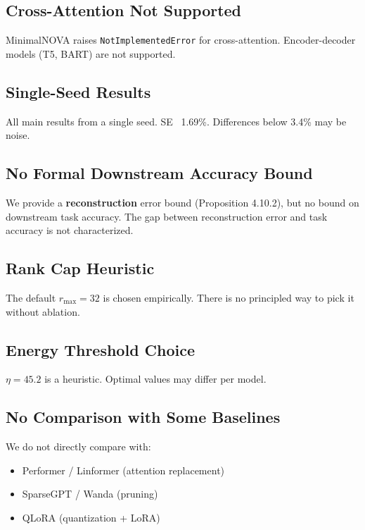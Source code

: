 \subsection{Cross-Attention Not Supported}

MinimalNOVA raises \texttt{NotImplementedError} for cross-attention. Encoder-decoder 
models (T5, BART) are not supported.

\subsection{Single-Seed Results}

All main results from a single seed. SE ~1.69\%. Differences below 3.4\% may 
be noise.

\subsection{No Formal Downstream Accuracy Bound}

We provide a \textbf{reconstruction} error bound (Proposition 4.10.2), but no 
bound on downstream task accuracy. The gap between reconstruction error and 
task accuracy is not characterized.

\subsection{Rank Cap Heuristic}

The default $r_\text{max} = 32$ is chosen empirically. There is no 
principled way to pick it without ablation.

\subsection{Energy Threshold Choice}

$\eta = 45.2$ is a heuristic. Optimal values may differ per model.

\subsection{No Comparison with Some Baselines}

We do not directly compare with:
\begin{itemize}
\item Performer / Linformer (attention replacement)
\item SparseGPT / Wanda (pruning)
\item QLoRA (quantization + LoRA)

\end{itemize}
